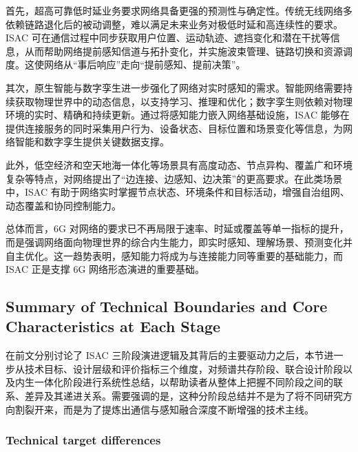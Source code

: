 首先，超高可靠低时延业务要求网络具备更强的预测性与确定性。传统无线网络多依赖链路退化后的被动调整，难以满足未来业务对极低时延和高连续性的要求。ISAC 可在通信过程中同步获取用户位置、运动轨迹、遮挡变化和潜在干扰等信息，从而帮助网络提前感知信道与拓扑变化，并实施波束管理、链路切换和资源调度\cite{Liu2022ISAC,Zhang2020perceptive}。这使网络从“事后响应”走向“提前感知、提前决策”。

其次，原生智能与数字孪生进一步强化了网络对实时感知的需求。智能网络需要持续获取物理世界中的动态信息，以支持学习、推理和优化；数字孪生则依赖对物理环境的实时、精确和持续更新\cite{Saad2020Vision6G,Khan2022digital}。通过将感知能力嵌入网络基础设施，ISAC 能够在提供连接服务的同时采集用户行为、设备状态、目标位置和场景变化等信息，为网络智能和数字孪生提供关键数据支撑。

此外，低空经济和空天地海一体化等场景具有高度动态、节点异构、覆盖广和环境复杂等特点，对网络提出了“边连接、边感知、边决策”的更高要求\cite{Saad2020Vision6G,IMT2030Framework}。在此类场景中，ISAC 有助于网络实时掌握节点状态、环境条件和目标活动，增强自治组网、动态覆盖和协同控制能力。

总体而言，6G 对网络的要求已不再局限于速率、时延或覆盖等单一指标的提升，而是强调网络面向物理世界的综合内生能力，即实时感知、理解场景、预测变化并自主优化\cite{Liu2022ISAC,Gonzalez2024integrated,Saad2020Vision6G}。这一趋势表明，感知能力将成为与连接能力同等重要的基础能力，而 ISAC 正是支撑 6G 网络形态演进的重要基础。

\subsection{Summary of Technical Boundaries and Core Characteristics at Each Stage}
\label{subsec:ch1-evolution-summary}

在前文分别讨论了 ISAC 三阶段演进逻辑及其背后的主要驱动力之后，本节进一步从技术目标、设计层级和评价指标三个维度，对频谱共存阶段、联合设计阶段以及内生一体化阶段进行系统性总结，以帮助读者从整体上把握不同阶段之间的联系、差异及其递进关系。需要强调的是，这种分阶段总结并不是为了将不同研究方向割裂开来，而是为了提炼出通信与感知融合深度不断增强的技术主线。

\subsubsection{Technical target differences}
\label{subsubsec:ch1-target-differences}

